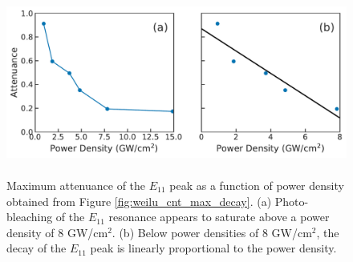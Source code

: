 \begin{figure}[H]
	\centering
	\includegraphics[height=2.4in]{images/chapter_my_data/Weilu_CNT_max_attenuance_and_fit}
	\caption{Maximum attenuance of the $E_{11}$ peak as a function of power density obtained from Figure \ref{fig:weilu_cnt_max_decay}. (a) Photo-bleaching of the $E_{11}$ resonance appears to saturate above a power density of 8 GW/cm$^2$. (b) Below power densities of 8 GW/cm$^2$, the decay of the $E_{11}$ peak is linearly proportional to the power density.}
	\label{fig:weilu_cnt_max_decay_fit}
\end{figure}

